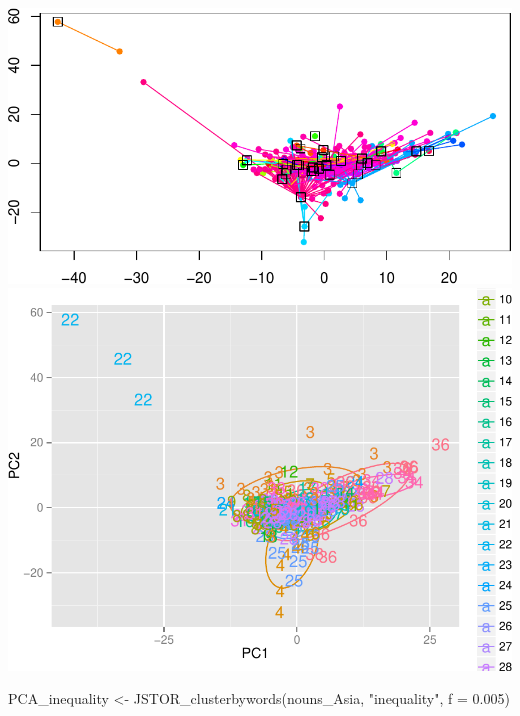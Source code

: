 \documentclass[10pt]{article}
\newenvironment{CodeChunk}{}{}
\begin{document}
\begin{CodeChunk}
\begin{CodeChunk}
\includegraphics{509Assignment_files/figure-latex/onegram3-6} 
\includegraphics{509Assignment_files/figure-latex/onegram3-7} \begin{CodeInput}
PCA_inequality <- JSTOR_clusterbywords(nouns_Asia, "inequality", f = 0.005)
\end{CodeInput}


\end{CodeChunk}
\end{CodeChunk}
\end{document}
